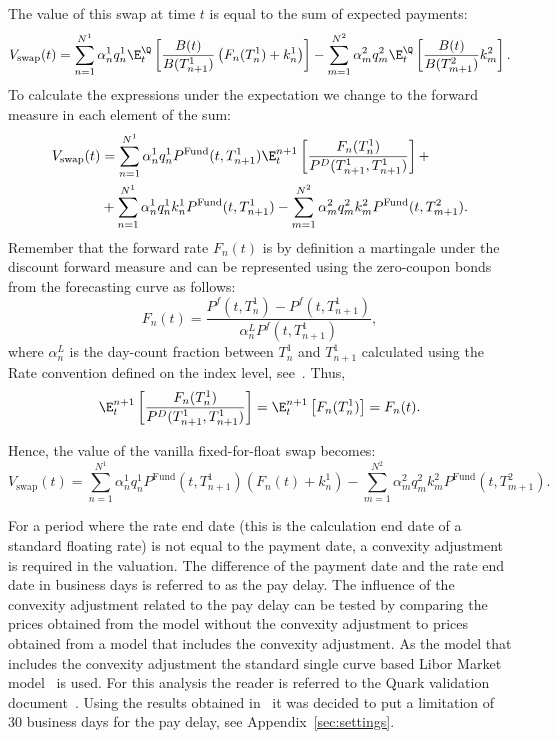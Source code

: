 \documentclass[]{pmv_report} %
\begin{document}
The value of this swap at time $t$ is equal to the sum of expected payments:
\begin{equation*}
  V_{\text{swap}}(t)=\sum_{n=1}^{N^1} \alpha_{n}^1 q_n^1\E_t^{\Q} \left[\frac{B(t)}{B(T_{n+1}^1)} \left( F_n(T_n^1)+k_n^1\right)\right]
  - \sum_{m=1}^{N^2}\alpha_m^{2} q_m^2\E_t^{\Q} \left[\frac{B(t)}{B(T_{m+1}^2)} k_m^2\right].
\end{equation*}
To calculate the expressions under the expectation we change to the forward measure in each element of the sum:
\begin{align}
  V_{\text{swap}}(t) &= \sum_{n=1}^{N^1}
  \alpha_{n}^1 q_n^1 P^{\text{Fund}}(t,T_{n+1}^1)\E_t^{n+1} \left[\frac{ F_n(T_n^1)}{P^D(T_{n+1}^1,T_{n+1}^1)}\right]+ \nonumber \\
  &+ \sum_{n=1}^{N^1}
  \alpha_{n}^1 q_n^1 k_n^1 P^{\text{Fund}}(t,T_{n+1}^1)-
  \sum_{m=1}^{N^2} \alpha_m^{2} q_m^2 k_m^2 P^{\text{Fund}}(t,T_{m+1}^2).
\end{align}
Remember that the forward rate $F_n(t)$ is by definition a martingale under the discount forward measure and can be represented using the zero-coupon bonds from the forecasting curve as follows:
\begin{equation}
  F_n(t)=\frac{P^f(t,T_n^1)-P^f(t,T_{n+1}^1)}{\alpha_n^L P^f(t,T_{n+1}^1)},
\end{equation}
where $\alpha_n^L$ is the day-count fraction between $T_n^1$ and $T_{n+1}^1$ calculated using the Rate convention defined on the index level, see~\cite[Fig.2]{Mx.Index}.
Thus,
\begin{equation*}
 \E_t^{n+1} \left[\frac{ F_n(T_n^1)}{P^D(T_{n+1}^1,T_{n+1}^1)}\right]=\E_t^{n+1}\left[ F_n(T_n^1)\right]=F_n(t).
\end{equation*}

Hence, the value of the vanilla fixed-for-float swap becomes:
\begin{equation}
  V_{\text{swap}}(t)=\sum_{n=1}^{N^1}
  \alpha_{n}^1 q_n^1 P^{\text{Fund}}(t,T_{n+1}^1) (F_n(t)+k_n^1) -
  \sum_{m=1}^{N^2} \alpha_m^{2} q_m^2 k_m^2 P^{\text{Fund}}(t,T_{m+1}^2).
\end{equation}

For a period where the rate end date (this is the calculation end date of a standard floating rate) is not equal to the payment date, a convexity adjustment is required in the valuation.
The difference of the payment date and the rate end date in business days is referred to as the pay delay.
The influence of the convexity adjustment related to the pay delay can be tested by comparing the prices obtained from the model without the convexity adjustment to prices obtained from a model that includes the convexity adjustment.
As the model that includes the convexity adjustment the standard single curve based Libor Market model~\cite{Quark.CMM} is used.
For this analysis the reader is referred to the Quark validation document~\cite{Quark.RateAdj}.
Using the results obtained in~\cite{Quark.RateAdj} it was decided to put a limitation of $30$ business days for the pay delay, see Appendix~\ref{sec:settings}.
\end{document}
